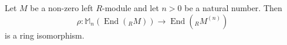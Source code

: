 Let $M$ be a non-zero left $R$-module and let $n > 0$ be a natural number. Then
$$\rho : \mathbb{M}_n(\operatorname{End}({}_R M)) \to \operatorname{End}({}_R M^{(n)})$$
is a ring isomorphism.
